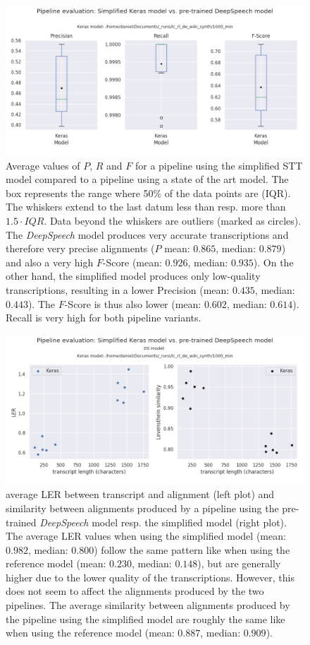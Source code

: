 \begin{figure}[h!]
	\includegraphics[width=\linewidth]{./img/boxplot_rl.png}
	\caption{Average values of $P$, $R$ and $F$ for a pipeline using the simplified \ac{STT} model compared to a pipeline using a state of the art model. The box represents the range where 50\% of the data points are (\ac{IQR}). The whiskers extend to the last datum less than resp. more than $1.5 \cdot IQR$. Data beyond the whiskers are outliers (marked as circles). The \textit{DeepSpeech} model produces very accurate transcriptions and therefore very precise alignments ($P$ mean: $0.865$, median: $0.879$) and also a very high $F$-Score (mean: $0.926$, median: $0.935$). On the other hand, the simplified model produces only low-quality transcriptions, resulting in a lower Precision (mean: $0.435$, median: $0.443$). The $F$-Score is thus also lower (mean: $0.602$, median: $0.614$). Recall is very high for both pipeline variants.}
	\label{pipeline_boxplot_rl_de}
\end{figure}

\begin{figure}[h!]
	\includegraphics[width=\linewidth]{./img/scatterplot_rl.png}
	\caption{average \ac{LER} between transcript and alignment (left plot) and similarity between alignments produced by a pipeline using the pre-trained \textit{DeepSpeech} model resp. the simplified model (right plot). The average \ac{LER} values when using the simplified model (mean: $0.982$, median: $0.800$) follow the same pattern like when using the reference model (mean: $0.230$, median: $0.148$), but are generally higher due to the lower quality of the transcriptions. However, this does not seem to affect the alignments produced by the two pipelines. The average similarity between alignments produced by the pipeline using the simplified model are roughly the same like when using the reference model (mean: $0.887$, median: $0.909$).}
	\label{pipeline_scatterplot_rl_de}
\end{figure}

